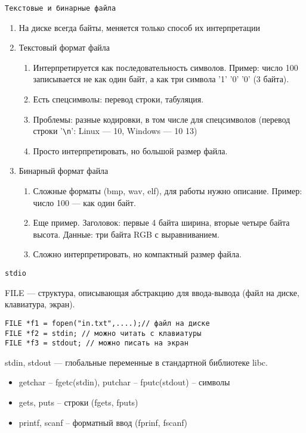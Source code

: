 \documentclass[pdf, 10pt, unicode]{beamer}
\newcommand*{\escape}[1]{\texttt{\textbackslash#1}}
\begin{document}
\begin{frame}[fragile]{{\tt Текстовые и бинарные файла}}
\begin{enumerate}
  \item На диске всегда байты, меняется только способ их интерпретации
  \item Текстовый формат файла
    \begin{enumerate}
        \item Интерпретируется как последовательность символов. Пример: число 100 записывается не как один байт, а как три символа '1' '0' '0' (3 байта).
        \item Есть спецсимволы: перевод строки, табуляция.
        \item Проблемы: разные кодировки, в том числе для спецсимволов (перевод строки '\escape{n}': Linux --- 10, Windows --- 10 13)
        \item Просто интерпретировать, но большой размер файла.
    \end{enumerate}
  \item Бинарный формат файла
    \begin{enumerate}
        \item Сложные форматы (bmp, wav, elf), для работы нужно описание. Пример: число 100 --- как один байт.
        \item Еще пример. Заголовок: первые 4 байта ширина, вторые четыре байта высота. Данные: три байта RGB с выравниванием.
        \item Сложно интерпретировать, но компактный размер файла.
    \end{enumerate}
\end{enumerate}

\end{frame}

\begin{frame}[fragile]{{\tt stdio}}

FILE --- структура, описывающая абстракцию для ввода-вывода (файл на диске, клавиатура, экран).
\begin{lstlisting}
FILE *f1 = fopen("in.txt",....);// файл на диске
FILE *f2 = stdin; // можно читать с клавиатуры
FILE *f3 = stdout; // можно писать на экран
\end{lstlisting}

stdin, stdout --- глобальные переменные в стандартной библиотеке libc.

\begin{itemize}
  \item getchar -- fgetc(stdin), putchar -- fputc(stdout) -- символы
  \item gets, puts -- строки (fgets, fputs)
  \item printf, scanf -- форматный ввод (fprinf, fscanf)
\end{itemize}

\end{frame}
\end{document}
